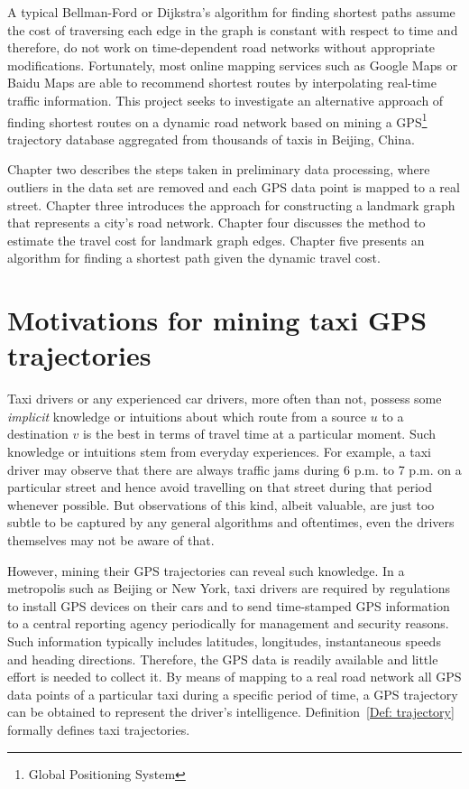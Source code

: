 A typical Bellman-Ford\cite{CLRS09} or Dijkstra's algorithm\cite{Dij59} for finding shortest paths assume the cost of traversing each edge in the graph is constant with respect to time and therefore, do not work on time-de\-pendent road networks without appropriate modifications. Fortunately, most online mapping services such as Google Maps or Baidu Maps are able to recommend shortest routes by interpolating real-time traffic information. This project seeks to investigate an alternative approach of finding shortest routes on a dynamic road network based on mining a GPS\footnote{Global Positioning System} trajectory database aggregated from thousands of taxis in Beijing, China.

Chapter two describes the steps taken in preliminary data processing, where outliers in the data set are removed and each GPS data point is mapped to a real street. Chapter three introduces the approach for constructing a landmark graph that represents a city's road network. Chapter four discusses the method to estimate the travel cost for landmark graph edges. Chapter five presents an algorithm for finding a shortest path given the dynamic travel cost. 

\section{Motivations for mining taxi GPS trajectories}
Taxi drivers or any experienced car drivers, more often than not, possess some \emph{implicit} knowledge or intuitions about which route from a source $u$ to a destination $v$ is the best in terms of travel time at a particular moment. Such knowledge or intuitions stem from everyday experiences. For example, a taxi driver may observe that there are always traffic jams during 6 p.m. to 7 p.m. on a particular street and hence avoid travelling on that street during that period whenever possible. But observations of this kind, albeit valuable, are just too subtle to be captured by any general algorithms and oftentimes, even the drivers themselves may not be aware of that.

However, mining their GPS trajectories can reveal such knowledge. In a metropolis such as Beijing or New York, taxi drivers are required by regulations to install GPS devices on their cars and to send time-stamped GPS information to a central reporting agency periodically for management and security reasons. Such information typically includes latitudes, longitudes, instantaneous speeds and heading directions. Therefore, the GPS data is readily available and little effort is needed to collect it. By means of mapping to a real road network all GPS data points of a particular taxi during a specific period of time, a GPS trajectory can be obtained to represent the driver's intelligence. Definition~\ref{Def: trajectory} formally defines taxi trajectories. 

